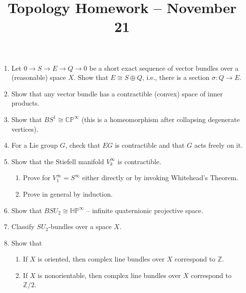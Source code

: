 \documentclass{amsart}
\title{Topology Homework -- November 21}
\author{}
\begin{document}
\large
\maketitle
\begin{enumerate} \itemsep 10pt
   \item Let $0 \to S \to E \to Q \to 0$ be a short exact sequence of vector
      bundles over a (reasonable) space $X$. Show that $E \cong S \oplus Q$,
      i.e., there is a section $\sigma : Q \to E$.
   \item Show that any vector bundle has a contractible (convex) space of inner
      products.
   \item Show that $BS^1 \cong \mathbb{CP}^\infty$ (this is a homeomorphism
      after collapsing degenerate vertices).
   \item For a Lie group $G$, check that $EG$ is contractible and that $G$ acts
      freely on it.
   \item Show that the Stiefell manifold $V_k^\infty$ is contractible.
      \begin{enumerate}
         \item Prove for $V_1^\infty = S^\infty$ either directly or by invoking
            Whitehead's Theorem.
         \item Prove in general by induction.
      \end{enumerate}
   \item Show that $BSU_2 \cong \mathbb{HP}^\infty$ -- infinite quaternionic
      projective space.
   \item Classify $SU_2$-bundles over a space $X$.
   \item Show that
      \begin{enumerate}
         \item If $X$ is oriented, then complex line bundles over $X$ correspond
            to $\mathbb{Z}$.
         \item If $X$ is nonorientable, then complex line bundles over $X$
            correspond to $\mathbb{Z}/2$.
      \end{enumerate}
\end{enumerate}
\end{document}
